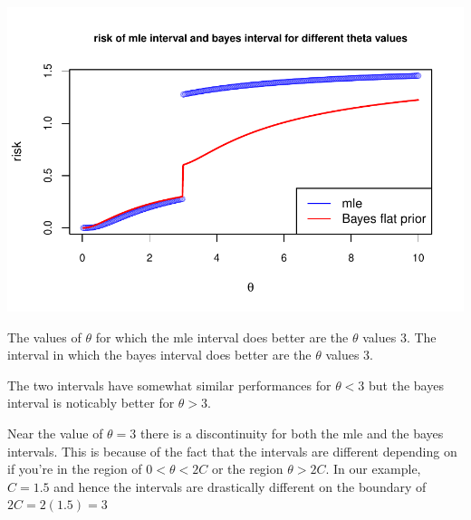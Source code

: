 \documentclass[12pt, a4paper]{article}\usepackage[]{graphicx}\usepackage[]{color}
\makeatletter
\def\maxwidth{ %
  \ifdim\Gin@nat@width>\linewidth
    \linewidth
  \else
    \Gin@nat@width
  \fi
}
\makeatother
\begin{document}
\begin{enumerate}[label={\bfseries\arabic*}]
\begin{Schunk}
{\centering \includegraphics[width=\maxwidth]{figure/unnamed-chunk-10-1} 

}

\end{Schunk}
The values of $\theta$ for which the mle interval does better are the $\theta$ values  3. The interval in which the bayes interval does better are the $\theta$ values  3. 

The two intervals have somewhat similar performances for $\theta < 3$ but the bayes interval is noticably better for $\theta > 3$. 

Near the value of $\theta = 3$ there is a discontinuity for both the mle and the bayes intervals. This is because of the fact that the intervals are different depending on if you're in the region of $0 < \theta < 2C$ or the region $\theta > 2C$. In our example, $C = 1.5$ and hence the intervals are drastically different on the boundary of $2C = 2(1.5) = 3$
\end{enumerate}
\end{document}

